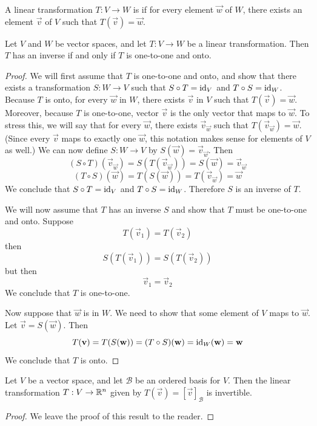 \documentclass{ximera}
\begin{document}
\begin{definition}[Onto]\label{def:onto} A linear transformation $T:V\rightarrow W$ is  if for every element $\vec{w}$ of $W$, there exists an element $\vec{v}$ of $V$ such that $T(\vec{v})=\vec{w}$.
\end{definition}

\begin{theorem}\label{th:isomeansinvert} Let $V$ and $W$ be vector spaces, and let $T:V\rightarrow W$ be a linear transformation.  Then $T$ has an inverse if and only if $T$ is one-to-one and onto. 
\end{theorem}
\begin{proof}
We will first assume that $T$ is one-to-one and onto, and show that there exists a transformation $S:W\rightarrow V$ such that $S\circ T=\text{id}_V$ and $T\circ S=\text{id}_W$.  Because $T$ is onto, for every $\vec{w}$ in $W$, there exists $\vec{v}$ in $V$ such that $T(\vec{v})=\vec{w}$.  Moreover, because $T$ is one-to-one, vector $\vec{v}$ is the only vector that maps to $\vec{w}$.  To stress this, we will say that for every $\vec{w}$, there exists $\vec{v}_{\vec{w}}$ such that $T(\vec{v}_{\vec{w}})=\vec{w}$. (Since every $\vec{v}$ maps to exactly one $\vec{w}$, this notation makes sense for elements of $V$ as well.)  We can now define $S:W\rightarrow V$ by $S(\vec{w})=\vec{v}_{\vec{w}}$.
Then
$$(S\circ T)(\vec{v}_{\vec{w}})=S(T(\vec{v}_{\vec{w}}))=S(\vec{w})=\vec{v}_{\vec{w}}$$
$$(T\circ S)(\vec{w})=T(S(\vec{w}))=T(\vec{v}_{\vec{w}})=\vec{w}$$
We conclude that $S\circ T=\text{id}_V$ and $T\circ S=\text{id}_W$.  Therefore $S$ is an inverse of $T$.

We will now assume that $T$ has an inverse $S$ and show that $T$ must be one-to-one and onto.  
Suppose $$T(\vec{v}_1)=T(\vec{v}_2)$$ then $$S(T(\vec{v}_1))=S(T(\vec{v}_2))$$
but then
$$\vec{v}_1=\vec{v}_2$$
We conclude that $T$ is one-to-one.

Now suppose that $\vec{w}$ is in $W$.  We need to show that some element of $V$ maps to $\vec{w}$.  Let $\vec{v}=S(\vec{w})$.  Then
$$T(\mathbf{v})=T(S(\mathbf{w}))=(T\circ S)(\mathbf{w})=\text{id}_W(\mathbf{w})=\mathbf{w}$$
We conclude that $T$ is onto.
\end{proof}

\begin{theorem}\label{ex:coordmapiso}
Let $V$ be a vector space, and let $\mathcal{B}$ be an ordered basis for $V$.  Then  the linear transformation $T:V\rightarrow \mathbb{R}^n$ given by $T(\vec{v})=[\vec{v}]_{\mathcal{B}}$ is invertible.
\end{theorem}
\begin{proof}
We leave the proof of this result to the reader. 
\end{proof}
\end{document}
